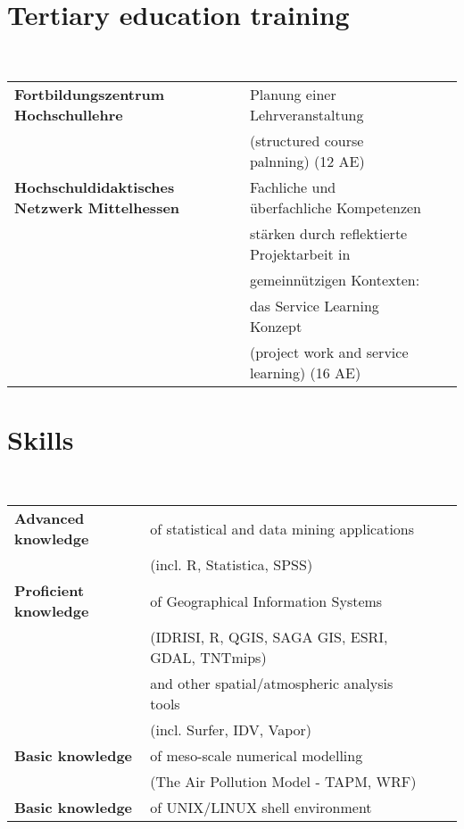 \documentclass[a4paper,11pt]{article}
\begin{document}
\section{Tertiary education training}
\hrulefill \\
\begin{tabular}{llll} \\
\textbf{Fortbildungszentrum Hochschullehre} & Planung einer Lehrveranstaltung\\
											& (structured course palnning) (12 AE)\\
\textbf{Hochschuldidaktisches Netzwerk Mittelhessen} & Fachliche und \"uberfachliche Kompetenzen\\
			& st\"arken durch reflektierte Projektarbeit in\\
			& gemeinn\"utzigen Kontexten:\\
			& das Service Learning Konzept\\
			& (project work and service learning) (16 AE)
\end{tabular}

\pagebreak{}
\section{Skills}
\hrulefill \\
\begin{tabular}{llll} \\
\textbf{Advanced knowledge} & of statistical and data mining applications\\
				   & (incl. R, Statistica, SPSS)\\
\textbf{Proficient knowledge} & of Geographical Information Systems\\
					& (IDRISI, R, QGIS, SAGA GIS, ESRI, GDAL, TNTmips)\\
					& and other spatial/atmospheric analysis tools\\
					& (incl. Surfer, IDV, Vapor)\\
\textbf{Basic knowledge} & of meso-scale numerical modelling\\
				   & (The Air Pollution Model - TAPM, WRF)\\
\textbf{Basic knowledge} & of UNIX/LINUX shell environment
\end{tabular}
\linebreak{}
\end{document}
